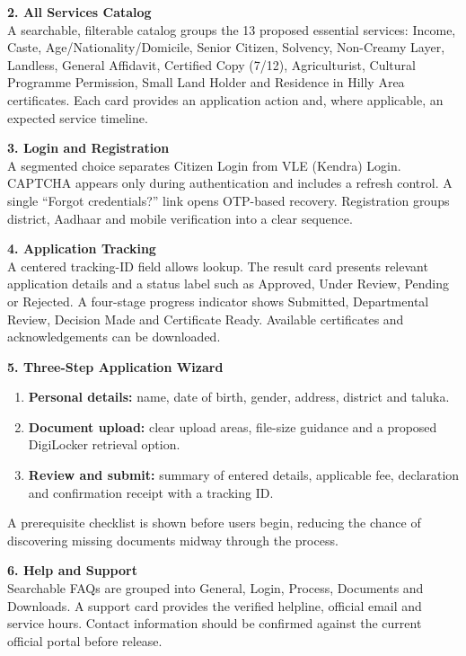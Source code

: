 \documentclass[10pt,a4paper]{article}
\begin{document}
\textbf{2. All Services Catalog}\\
A searchable, filterable catalog groups the 13 proposed essential services: Income, Caste, Age/Nationality/Domicile, Senior Citizen, Solvency, Non-Creamy Layer, Landless, General Affidavit, Certified Copy (7/12), Agriculturist, Cultural Programme Permission, Small Land Holder and Residence in Hilly Area certificates. Each card provides an application action and, where applicable, an expected service timeline.

\textbf{3. Login and Registration}\\
A segmented choice separates Citizen Login from VLE (Kendra) Login. CAPTCHA appears only during authentication and includes a refresh control. A single “Forgot credentials?” link opens OTP-based recovery. Registration groups district, Aadhaar and mobile verification into a clear sequence.

\textbf{4. Application Tracking}\\
A centered tracking-ID field allows lookup. The result card presents relevant application details and a status label such as Approved, Under Review, Pending or Rejected. A four-stage progress indicator shows Submitted, Departmental Review, Decision Made and Certificate Ready. Available certificates and acknowledgements can be downloaded.

\textbf{5. Three-Step Application Wizard}
\begin{enumerate}
\item \textbf{Personal details:} name, date of birth, gender, address, district and taluka.
\item \textbf{Document upload:} clear upload areas, file-size guidance and a proposed DigiLocker retrieval option.
\item \textbf{Review and submit:} summary of entered details, applicable fee, declaration and confirmation receipt with a tracking ID.
\end{enumerate}
A prerequisite checklist is shown before users begin, reducing the chance of discovering missing documents midway through the process.

\textbf{6. Help and Support}\\
Searchable FAQs are grouped into General, Login, Process, Documents and Downloads. A support card provides the verified helpline, official email and service hours. Contact information should be confirmed against the current official portal before release.
\end{document}
